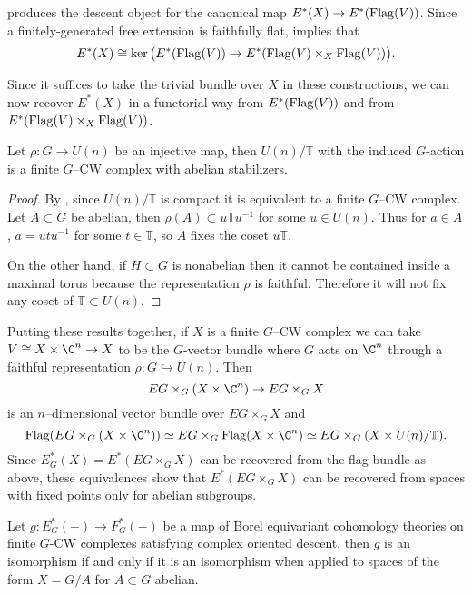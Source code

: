produces the descent object for the canonical map \(E^*(X) \rightarrow E^*(\operatorname{Flag}(V))\). Since a finitely-generated free extension is faithfully flat,  implies that
\begin{equation*}
E^*(X) \cong \ker \big (E^*(\operatorname{Flag}(V)) \rightarrow E^*(\operatorname{Flag}(V) \times_X \operatorname{Flag}(V)) \big ).
\end{equation*}

Since it suffices to take the trivial bundle over \(X\) in these constructions, we can now recover \(E^*(X)\) in a functorial way from \(E^*(\operatorname{Flag}(V))\) and from \(E^*(\operatorname{Flag}(V) \times_X \operatorname{Flag}(V))\).

\begin{proposition}
Let \(\rho \colon G \rightarrow U(n)\) be an injective map, then \(U(n)/\mathbb{T}\) with the induced \(G\)-action is a finite \(G\)--CW complex with abelian stabilizers.
\end{proposition}
\begin{proof}
By , since \(U(n)/\mathbb{T}\) is compact it is equivalent to a finite \(G\)--CW complex. Let \(A \subset G\) be abelian, then \(\rho(A) \subset u\mathbb{T}u^{-1}\) for some \(u \in U(n)\). Thus for \(a \in A\), \(a = utu^{-1}\) for some \(t \in \mathbb{T}\), so \(A\) fixes the coset \(u\mathbb{T}\).

On the other hand, if \(H \subset G\) is nonabelian then it cannot be contained inside a maximal
torus because the representation \(\rho\) is faithful. Therefore it will not fix any coset of \(\mathbb{T} \subset U(n)\).
\end{proof}

Putting these results together, if \(X\) is a finite \(G\)--CW complex we can take \(V \cong X \times \C^n \rightarrow X\) to be the \(G\)-vector bundle where \(G\) acts on \(\C^n\) through a faithful representation \(\rho \colon G \hookrightarrow U(n)\). Then 
\[
EG \times_G (X \times \C^n) \rightarrow EG \times_G X
\]
is an \(n\)--dimensional vector bundle over \(EG \times_G X\) and
\[
\Flag(EG \times_G (X \times \C^n)) \simeq EG \times_G \Flag(X \times \C^n) \simeq EG \times_G (X \times U(n)/\mathbb{T}).
\]
Since \(E^{*}_{G}(X) = E^*(EG \times_G X)\) can be recovered from the flag bundle as above, these equivalences show that \(E^*(EG \times_G X)\) can be recovered from spaces with fixed points only for abelian subgroups. 

\begin{proposition} \label{app:codescent}
Let \(g \colon E_{G}^*(-) \rightarrow F_{G}^*(-)\) be a map of Borel equivariant cohomology theories on finite \(G\)-CW complexes satisfying complex oriented descent, then \(g\) is an isomorphism if and only if it is an isomorphism when applied to spaces of the form \(X = G/A\) for \(A \subset G\) abelian.
\end{proposition}

